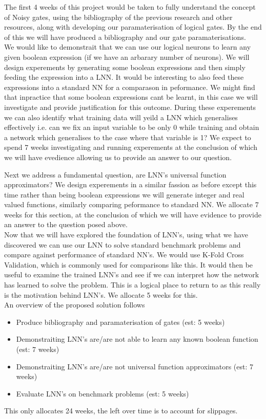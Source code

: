 \documentclass[11pt, a4paper, twoside, openright]{report}
\begin{document}
The first 4 weeks of this project would be taken to fully understand the concept of Noisy gates, using the bibliography of the previous research and other resources, along with developing our paramaterisation of logical gates. By the end of this we will have produced a bibliography and our gate paramaterisations.\\

We would like to demonstrait that we can use our logical neurons to learn any given boolean expression (if we have an arbarary number of neurons). We will design experements by generating some boolean expressions and then simply feeding the expression into a LNN. It would be interesting to also feed these expressions into a standard NN for a comparason in peformance. We might find that inpractice that some boolean expressions cant be learnt, in this case we will investigate and provide justification for this outcome. During these experements we can also identify what training data will yeild a LNN which generalises effectively i.e. can we fix an input variable to be only 0 while training and obtain a network which generalises to the case where that variable  is 1? We expect to spend 7 weeks investigating and running experements at the conclusion of which we will have evedience allowing us to provide an answer to our question.

Next we address a fundamental question, are LNN's universal function approximators? We design experements in a similar fassion as before except this time rather than being boolean expressions we will generate integer and real valued functions, similarly comparing peformance to standard NN. We allocate 7 weeks for this section, at the conclusion of which we will have evidence to provide an answer to the question posed above. \\

Now that we will have explored the foundation of LNN's, using what we have discovered we can use our LNN to solve standard benchmark problems and compare against performance of standard NN's. We would use K-Fold Cross Validation, which is commonly used for comparisons like this. It would then be useful to examine the trained LNN's and see if we can interpret how the network has learned to solve the problem. This is a logical place to return to as this really is the motivation behind LNN's. We allocate 5 weeks for this. \\

An overview of the proposed solution follows
\begin{itemize}
\item Produce bibliography and paramaterisation of gates (est: 5 weeks)
\item Demonstraiting LNN's are/are not able to learn any known boolean function (est: 7 weeks)
\item Demonstraiting LNN's are/are not universal function approximators (est: 7 weeks)
\item Evaluate LNN's on benchmark problems (est: 5 weeks)
\end{itemize}
This only allocates 24 weeks, the left over time is to account for slippages.
\end{document}
